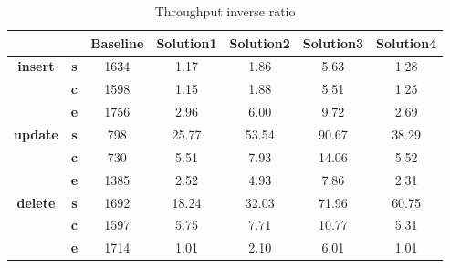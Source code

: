 \begin{table}[h]
\newcommand{\B}[1]{\colorbox{light-gray}{#1}}
 \centering
\caption{Throughput inverse ratio}\label{t:}
\begin{tabular}{ccccccc}
\toprule
&&\textbf{Baseline} & \textbf{Solution1} & \textbf{Solution2} & \textbf{Solution3} & \textbf{Solution4}\\
\midrule
\multirow{3}{*}{\textbf{insert}} & \textbf{s} & 1634 & 1.17 & 1.86 & 5.63 & 1.28\\
 & \textbf{c} & 1598 & 1.15 & 1.88 & 5.51 & 1.25\\
 & \textbf{e} & 1756 & 2.96 & 6.00 & 9.72 & 2.69\\
\midrule
\multirow{3}{*}{\textbf{update}} & \textbf{s} & 798 & 25.77 & 53.54 & 90.67 & 38.29\\
 & \textbf{c} & 730 & 5.51 & 7.93 & 14.06 & 5.52\\
 & \textbf{e} & 1385 & 2.52 & 4.93 & 7.86 & 2.31\\
\midrule
\multirow{3}{*}{\textbf{delete}} & \textbf{s} & 1692 & 18.24 & 32.03 & 71.96 & 60.75\\
 & \textbf{c} & 1597 & 5.75 & 7.71 & 10.77 & 5.31\\
 & \textbf{e} & 1714 & 1.01 & 2.10 & 6.01 & 1.01\\
\bottomrule
\end{tabular}
\end{table}






